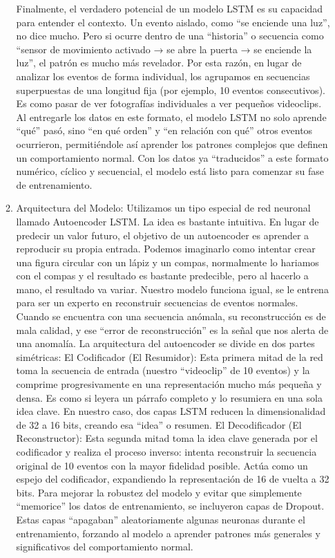 \begin{enumerate}
\begin{enumerate}
                        Finalmente, el verdadero potencial de un modelo LSTM es su capacidad para entender el contexto. Un evento aislado, como ``se enciende una luz'', no dice mucho. Pero si ocurre dentro de una ``historia'' o secuencia como ``sensor de movimiento activado → se abre la puerta → se enciende la luz'', el patrón es mucho más revelador.
                        Por esta razón, en lugar de analizar los eventos de forma individual, los agrupamos en secuencias superpuestas de una longitud fija (por ejemplo, 10 eventos consecutivos). Es como pasar de ver fotografías individuales a ver pequeños videoclips.
                        Al entregarle los datos en este formato, el modelo LSTM no solo aprende ``qué'' pasó, sino ``en qué orden'' y ``en relación con qué'' otros eventos ocurrieron, permitiéndole así aprender los patrones complejos que definen un comportamiento normal. Con los datos ya ``traducidos'' a este formato numérico, cíclico y secuencial, el modelo está listo para comenzar su fase de entrenamiento.

                  \item Arquitectura del Modelo: Utilizamos un tipo especial de red neuronal llamado Autoencoder LSTM.
                        La idea es bastante intuitiva. En lugar de predecir un valor futuro, el objetivo de un autoencoder es aprender a reproducir su propia entrada.
                        Podemos imaginarlo como intentar crear una figura circular con un lápiz y un compas, normalmente lo hariamos con el compas y el resultado es bastante predecible, pero al hacerlo a mano, el resultado va variar.
                        Nuestro modelo funciona igual, se le entrena para ser un experto en  reconstruir secuencias de eventos normales. Cuando se encuentra con una secuencia anómala, su reconstrucción es de mala calidad, y ese ``error de reconstrucción'' es la señal que nos alerta de una anomalía.
                        La arquitectura del autoencoder se divide en dos partes simétricas:
                        El Codificador (El Resumidor): Esta primera mitad de la red toma la secuencia de entrada (nuestro ``videoclip'' de 10 eventos) y la comprime progresivamente en una representación mucho más pequeña y densa. Es como si leyera un párrafo completo y lo resumiera en una sola idea clave. En nuestro caso, dos capas LSTM reducen la dimensionalidad de 32 a 16 bits, creando esa ``idea'' o resumen.
                        El Decodificador (El Reconstructor): Esta segunda mitad toma la idea clave generada por el codificador y realiza el proceso inverso: intenta reconstruir la secuencia original de 10 eventos con la mayor fidelidad posible. Actúa como un espejo del codificador, expandiendo la representación de 16 de vuelta a 32 bits.
                        Para mejorar la robustez del modelo y evitar que simplemente ``memorice'' los datos de entrenamiento, se incluyeron capas de Dropout. Estas capas ``apagaban'' aleatoriamente algunas neuronas durante el entrenamiento, forzando al modelo a aprender patrones más generales y significativos del comportamiento normal.


\end{enumerate}
\end{enumerate}
